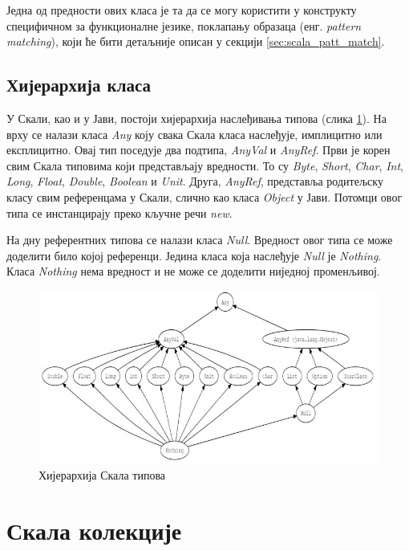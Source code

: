 \documentclass[12pt,oneside]{memoir}
\begin{document}
Једна од предности ових класа је та да се могу користити у конструкту специфичном за функционалне језике, поклапању образаца (енг. \textit{pattern matching}), који ће бити детаљније описан у секцији \ref{sec:scala_patt_match}. \cite{scala_prog}

\subsection{Хијерархија класа}
\label{subsec:scala_class_hier}

У Скали, као и у Јави, постоји хијерархија наслеђивања типова (слика \ref{fig:scala_types_hier}). На врху се налази класа \textit{Any} коју свака Скала класа наслеђује, имплицитно или експлицитно. Овај тип поседује два подтипа, \textit{AnyVal} и \textit{AnyRef}. Први је корен свим Скала типовима који представљају вредности. То су \textit{Byte}, \textit{Short}, \textit{Char}, \textit{Int}, \textit{Long}, \textit{Float}, \textit{Double}, \textit{Boolean} и \textit{Unit}. Друга, \textit{AnyRef}, представља родитељску класу свим референцама у Скали, слично као класа \textit{Object} у Јави. Потомци овог типа се инстанцирају преко кључне речи \textit{new}. \cite{scala_prog}

На дну референтних типова се налази класа \textit{Null}. Вредност овог типа се може доделити било којој референци. Једина класа која наслеђује \textit{Null} је \textit{Nothing}. Класа \textit{Nothing} нема вредност и не може се доделити ниједној променљивој.

\begin{figure}[!ht]
  \centering
  \includegraphics[width=1\textwidth]{pictures/scala-type-hierarchy.jpg}
  \caption{Хијерархија Скала типова}
  \label{fig:scala_types_hier}
\end{figure}

\section{Скала колекције}
\label{sec:scala_coll}
\end{document}
